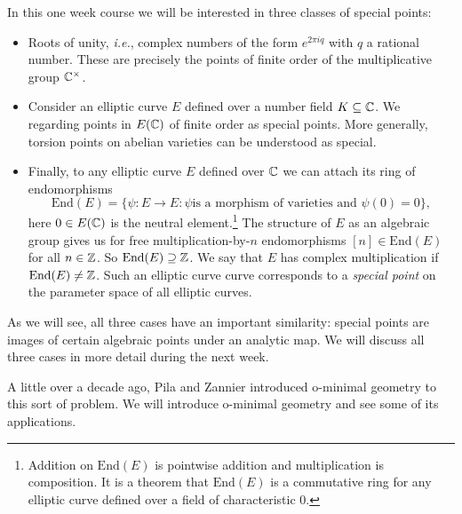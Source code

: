 In this one week course we will be interested in three classes of
special points:
\begin{itemize}
\item Roots of unity, \textit{i.e.}, complex numbers of the form
  $e^{2\pi i q}$ with $q$ a rational number. These are precisely the
  points of finite order of the multiplicative group ${\mathbb{C}}^\times$. 

\item Consider an elliptic curve $E$ defined over a number field
  $K\subseteq{\mathbb{C}}$. We regarding points in $E({\mathbb{C}})$ of finite order as
  special points. More generally, torsion points on abelian varieties
  can be understood as special.

\item Finally, to any elliptic curve $E$ defined over ${\mathbb{C}}$ we can
  attach its ring of endomorphisms
  $$\mathrm{End}(E) = \{\psi \colon E\rightarrow E : \psi\text{
    is a morphism of varieties and }\psi(0)=0\},$$
  here $0\in E({\mathbb{C}})$ is the neutral element.\footnote{Addition on
    $\mathrm{End}(E)$ is pointwise addition and multiplication is
    composition. It is a theorem that $\mathrm{End}(E)$ is a
    commutative ring for any elliptic curve defined over a field of
    characteristic $0$.}
  The  structure of $E$ as an algebraic group gives us for free
  multiplication-by-$n$ endomorphisms $[n] \in \mathrm{End}(E)$ for
  all $n\in{\mathbb{Z}}$. So $\mathrm{End}(E) \supseteq {\mathbb{Z}}$.
  We say that $E$ has complex multiplication if
  $\mathrm{End}(E)\not={\mathbb{Z}}$.
  Such an elliptic curve curve corresponds to a \textit{special point}
  on the parameter space of all elliptic curves.   
\end{itemize}

As we will see, all three cases have an important similarity: special
points are images of certain algebraic points under an analytic map.
We will discuss all three cases in more detail during the next week. 

A little over a decade ago, Pila and Zannier introduced o-minimal
geometry to this sort of problem. We will introduce o-minimal geometry
and see some of its applications. 


